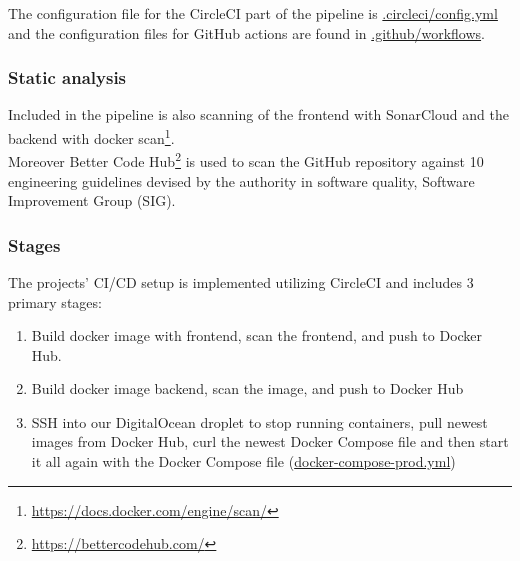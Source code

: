 The configuration file for the CircleCI part of the pipeline is \href{https://raw.githubusercontent.com/Chillhound/DevOps2022F/main/.circleci/config.yml }{.circleci/config.yml} and the configuration files for GitHub actions are found in \href{https://github.com/Chillhound/DevOps2022F/tree/main/.github/workflows}{.github/workflows}.

\subsubsection*{Static analysis}
Included in the pipeline is also scanning of the frontend with SonarCloud and the backend with docker scan\footnote{\url{https://docs.docker.com/engine/scan/}}. \\
Moreover Better Code Hub\footnote{\url{https://bettercodehub.com/}} is used to scan the GitHub repository against 10 engineering guidelines devised by the authority in software quality, Software Improvement Group (SIG). 

\subsubsection{Stages}
The projects' CI/CD setup is implemented utilizing CircleCI and includes 3 primary stages: 
\begin{enumerate}
    \item Build docker image with frontend, scan the frontend, and push to Docker Hub.
    \item Build docker image backend, scan the image, and push to Docker Hub
    \item SSH into our DigitalOcean droplet to stop running containers, pull newest images from Docker Hub, curl the newest Docker Compose file and then start it all again with the Docker Compose file (\href{https://raw.githubusercontent.com/Chillhound/DevOps2022F/main/docker-compose-prod.yml}{docker-compose-prod.yml})
\end{enumerate}

